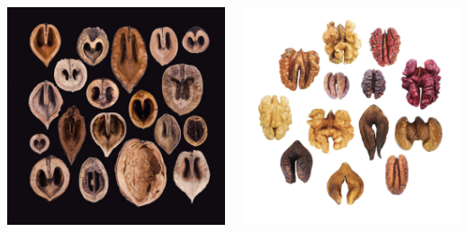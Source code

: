 \documentclass[
  ignorenonframetext,
  aspectratio=169]{beamer}
\newcommand{\bcolumns}{\begin{columns}[T, onlytextwidth]}
\newcommand{\ecolumns}{\end{columns}}
\begin{document}
\begin{frame}{}
\protect\hypertarget{section-6}{}
\bcolumns
{}

\begin{center}\includegraphics[width=0.8\linewidth]{../images/walnut_diversity1} \end{center}


\begin{center}\includegraphics[width=0.8\linewidth]{../images/walnut_diversity2} \end{center}

\ecolumns
\end{frame}
\end{document}
